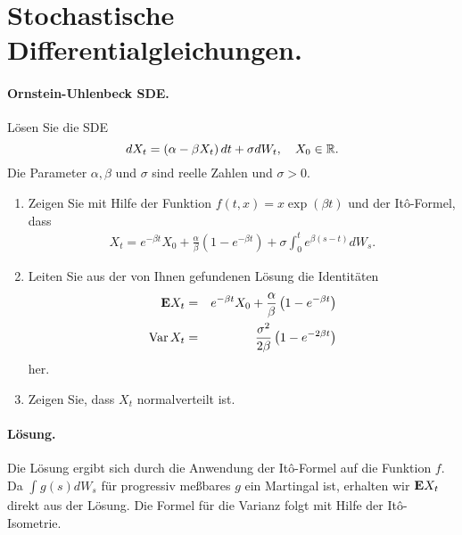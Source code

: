\section{Stochastische Differentialgleichungen. }

\paragraph{Ornstein-Uhlenbeck SDE.} Lösen Sie die \textsc{SDE}
\begin{equation}
    dX_t = \left( \alpha-\beta X_t \right)dt + \sigma dW_t, \quad X_0\in\mathbb R.
\end{equation}
Die Parameter $\alpha, \beta$ und $\sigma$ sind reelle Zahlen und $\sigma>0$. 
\begin{enumerate}
    \item Zeigen Sie mit Hilfe der Funktion $f(t,x)=x\exp(\beta t)$ und der It\^o-Formel, dass
        \begin{eqnarray}
            X_t = e^{-\beta t} X_0 + \frac{\alpha}{\beta}\left( 1-e^{-\beta t} \right)
                       + \sigma \int_{0}^{t} e^{\beta(s-t)} d W_s.
        \end{eqnarray}
    \item Leiten Sie aus der von Ihnen gefundenen Lösung die Identitäten
        \begin{eqnarray}
            \mathbf{E} X_t &=& e^{-\beta t} X_0 + \frac{\alpha}{\beta}\left( 1-e^{-\beta t} \right) \\
            \operatorname{Var} X_t &=& \frac{\sigma^2}{2\beta}\left( 1- e^{-2\beta t} \right)
        \end{eqnarray} 
        her.
    \item Zeigen Sie, dass $X_t$ normalverteilt ist. 
\end{enumerate}

\paragraph*{Lösung. } Die Lösung ergibt sich durch die Anwendung der It\^o-Formel
auf die Funktion $f$. Da $\int_{}^{} g(s) d W_s$ für progressiv meßbares $g$ ein
Martingal ist, erhalten wir $\mathbf{E} X_t$ direkt aus der Lösung. Die Formel für die 
Varianz folgt mit Hilfe der It\^o-Isometrie.



